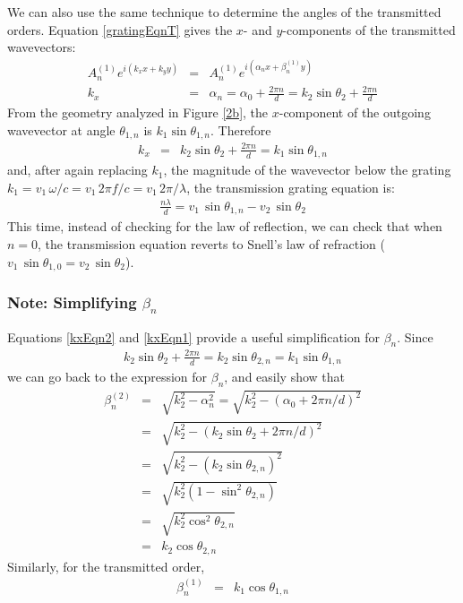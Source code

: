 We can also use the same technique to determine the angles of the transmitted orders.  Equation \ref{gratingEqnT} gives the $x$- and $y$-components of the transmitted wavevectors:
\begin{eqnarray}
A^{(1)}_n e^{i(k_x x + k_y y)} &=& A^{(1)}_n e^{i(\alpha_n x + \beta^{(1)}_n y)} \\
k_x &=& \alpha_n = \alpha_0 + \frac{ 2\pi n}{d} = k_2 \sin \theta_2 +\frac{ 2\pi n}{d}
\end{eqnarray}
From the geometry analyzed in Figure \ref{2b}, the $x$-component of the outgoing wavevector at angle $\theta_{1,n}$ is $k_1 \sin \theta_{1,n}$.  Therefore
\begin{eqnarray}
\label{kxEqn1}
k_x &=& k_2 \sin \theta_2 +\frac{ 2\pi n}{d} = k_1 \sin \theta_{1,n}
\end{eqnarray}
and, after again replacing $k_1$, the magnitude of the wavevector below the grating $k_1 = v_1\, \omega / c = v_1 \, 2\pi f / c =  v_1 \, 2\pi / \lambda$, the transmission grating equation is:
\begin{eqnarray}
\label{gratingEquation}
\frac{n \lambda}{d} = v_1 \, \sin \theta_{1,n} -  v_2 \, \sin \theta_{2}
\end{eqnarray}
This time, instead of checking for the law of reflection, we can check that when $n=0$, the transmission equation reverts to Snell's law of refraction ($v_1\, \sin \theta_{1,0} = v_2 \, \sin \theta_2$).

\subsubsection{Note: Simplifying $\beta_n$}
Equations \ref{kxEqn2} and \ref{kxEqn1} provide a useful simplification for $\beta_n$.  Since 
\begin{eqnarray}
k_2 \sin \theta_2 +\frac{ 2\pi n}{d} = k_2 \sin \theta_{2,n} = k_1 \sin \theta_{1,n}
\end{eqnarray}
we can go back to the expression for $\beta_n$, and easily show that 
\begin{eqnarray}
\beta_n^{(2)} &=& \sqrt{k_2^2 - \alpha_n^2} = \sqrt{k_2^2 - (\alpha_0 +2\pi n/d)^2} \\
&=& \sqrt{k_2^2 - (k_2 \sin \theta_2 +2\pi n/d)^2}\\
&=& \sqrt{ k_2^2 - (k_2 \sin \theta_{2,n})^2 }\\
&=& \sqrt{ k_2^2 (1 - \sin^2 \theta_{2,n})}\\
&=& \sqrt{ k_2^2 \cos^2 \theta_{2,n} }\\
&=& k_2 \cos \theta_{2,n}
\end{eqnarray}
Similarly, for the transmitted order,
\begin{eqnarray}
\beta_n^{(1)} &=& k_1 \cos \theta_{1,n}
\end{eqnarray}

